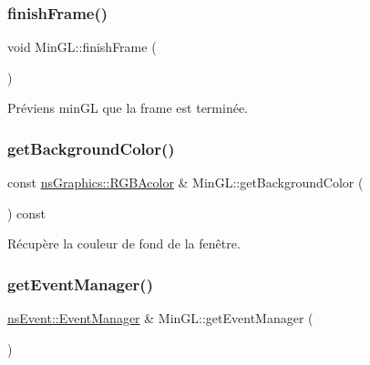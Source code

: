 \mbox{\label{class_min_g_l_a489922f0bdde2e38698adddaf57f6eda}} 
\subsubsection{\texorpdfstring{finish\+Frame()}{finishFrame()}}
{\footnotesize\ttfamily void Min\+G\+L\+::finish\+Frame (\begin{DoxyParamCaption}{ }\end{DoxyParamCaption})}



Préviens min\+GL que la frame est terminée. 

\mbox{\label{class_min_g_l_a66758e8e6983cc1dd0b10b1ee743a65a}} 
\subsubsection{\texorpdfstring{get\+Background\+Color()}{getBackgroundColor()}}
{\footnotesize\ttfamily const \hyperlink{classns_graphics_1_1_r_g_b_acolor}{ns\+Graphics\+::\+R\+G\+B\+Acolor} \& Min\+G\+L\+::get\+Background\+Color (\begin{DoxyParamCaption}{ }\end{DoxyParamCaption}) const}



Récupère la couleur de fond de la fenêtre. 

\mbox{\label{class_min_g_l_ab558253439905930836ab4910a7ae253}} 
\subsubsection{\texorpdfstring{get\+Event\+Manager()}{getEventManager()}}
{\footnotesize\ttfamily \hyperlink{classns_event_1_1_event_manager}{ns\+Event\+::\+Event\+Manager} \& Min\+G\+L\+::get\+Event\+Manager (\begin{DoxyParamCaption}{ }\end{DoxyParamCaption})}



